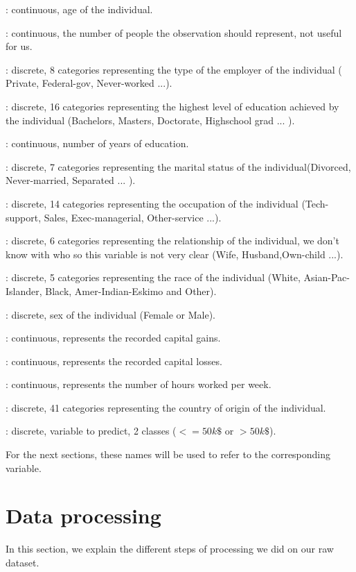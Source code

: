 \documentclass[11pt]{article}
\begin{document}
\begin{description}\itemsep0.5pt
\item[age] : continuous, age of the individual.
\item[fnlwgt] : continuous, the number of people the observation should represent, not useful for us.
\item[workclass] : discrete, 8 categories representing the type of the employer of the individual ( Private, Federal-gov, Never-worked ...).
\item[education] : discrete, 16 categories representing the highest level of education achieved by the individual (Bachelors, Masters, Doctorate, Highschool grad ... ).
\item[educationnum] : continuous, number of years of education.
\item[mstatus] : discrete, 7 categories representing the marital status of the individual(Divorced, Never-married, Separated ... ).
\item[occupation] : discrete, 14 categories representing the occupation of the individual (Tech-support, Sales, Exec-managerial, Other-service ...).
\item[relationship] : discrete, 6 categories representing the relationship of the individual, we don't know with who so this variable is not very clear (Wife, Husband,Own-child ...).
\item[race] : discrete, 5 categories representing the race of the individual (White, Asian-Pac-Islander, Black, Amer-Indian-Eskimo and Other).
\item[sex] : discrete, sex of the individual (Female or Male).
\item[capitalgain] : continuous, represents the recorded capital gains.
\item[capitalloss] : continuous, represents the recorded capital losses.
\item[hoursperweek] : continuous, represents the number of hours worked per week.
\item[nativecountry] : discrete, 41 categories representing the country of origin of the individual.
\item[target] : discrete, variable to predict, 2 classes ($<= 50k\$$ or $>50k\$$).
\end{description}
For the next sections, these names will be used to refer to the corresponding variable.
\section{Data processing}
In this section, we explain the different steps of processing we did on our raw dataset.
\end{document}
